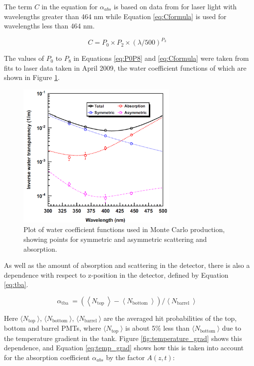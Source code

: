 The term $C$ in the equation for $\alpha_{abs}$ is based on data from \cite{Pope:97} for laser light with wavelengths greater than 464 nm while Equation \ref{eq:Cformula} is used for wavelengths less than 464 nm. 

\begin{equation}
C=P_{0} \times P_{2} \times(\lambda / 500)^{P_{3}}
\label{eq:Cformula}
\end{equation}

The values of $P_{0}$ to $P_{8}$ in Equations \ref{eq:P0P8} and \ref{eq:Cformula} were taken from fits to laser data taken in April 2009, the water coefficient functions of which are shown in Figure \ref{fig:water_coeff_plot}. 

\begin{figure}
    \centering
    \includegraphics[width=0.7\textwidth]{Figures/water_coeff_plot.png}
    \caption{Plot of water coefficient functions used in Monte Carlo production, showing points for symmetric and asymmetric scattering and absorption.}
    \label{fig:water_coeff_plot}
\end{figure}

As well as the amount of absorption and scattering in the detector, there is also a dependence with respect to z-position in the detector, defined by Equation \ref{eq:tba}.

\begin{equation}
    \alpha_{\text {tba }}=\left(\left\langle N_{\text {top }}\right\rangle-\left\langle N_{\text {bottom }}\right\rangle\right) /\left\langle N_{\text {barrel }}\right\rangle
    \label{eq:tba}   
\end{equation}

Here $\langle N_{\text {top }}\rangle$, $\langle N_{\text {bottom }}\rangle$, $\langle N_{\text {barrel }}\rangle$  are the averaged hit probabilities of the top, bottom and barrel PMTs, where  $\langle N_{\text {top }}\rangle$ is about 5\% less than $\langle N_{\text {bottom }}\rangle$ due to the temperature gradient in the tank. Figure \ref{fig:temperature_grad} shows this dependence, and Equation \ref{eq:temp_grad} shows how this is taken into account for the absorption coefficient $\alpha_{abs}$ by the factor $A(z,t)$:

